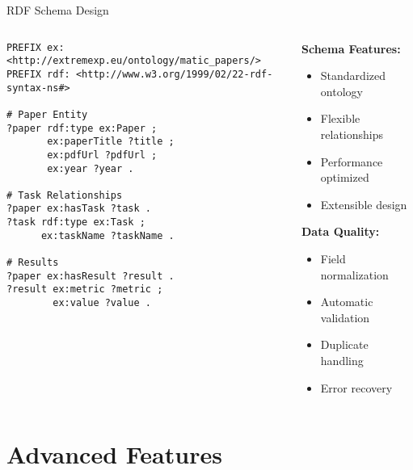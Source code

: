 \documentclass[aspectratio=169]{beamer}
\begin{document}
\begin{frame}[fragile]{RDF Schema Design}
    \begin{columns}[c]
        \begin{column}{0.6\textwidth}
            \begin{lstlisting}[language=sparql]
PREFIX ex: <http://extremexp.eu/ontology/matic_papers/>
PREFIX rdf: <http://www.w3.org/1999/02/22-rdf-syntax-ns#>

# Paper Entity
?paper rdf:type ex:Paper ;
       ex:paperTitle ?title ;
       ex:pdfUrl ?pdfUrl ;
       ex:year ?year .

# Task Relationships
?paper ex:hasTask ?task .
?task rdf:type ex:Task ;
      ex:taskName ?taskName .

# Results
?paper ex:hasResult ?result .
?result ex:metric ?metric ;
        ex:value ?value .
            \end{lstlisting}
        \end{column}
        \begin{column}{0.4\textwidth}
            \textbf{Schema Features:}
            \begin{itemize}
                \item Standardized ontology
                \item Flexible relationships
                \item Performance optimized
                \item Extensible design
            \end{itemize}
            
            \vspace{0.3cm}
            
            \textbf{Data Quality:}
            \begin{itemize}
                \item Field normalization
                \item Automatic validation
                \item Duplicate handling
                \item Error recovery
            \end{itemize}
        \end{column}
    \end{columns}
\end{frame}

\section{Advanced Features}
\end{document}
